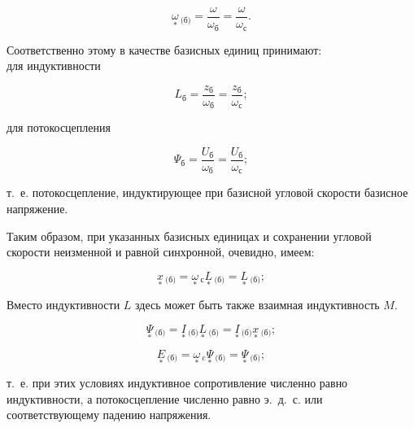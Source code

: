 \begin{equation} %
	\label{eq:chap2 omega_baz_otn}
	\underset{*}{\omega}\!\,_{\text{(б)}} = \frac{\omega}{\omega_{\text{б}}} = \frac{\omega}{\omega_{\text{с}}}.
\end{equation}

Соответственно этому в качестве базисных единиц принимают:\\
для индуктивности

\begin{equation*}
	L_{\text{б}} = \frac{z_{\text{б}}}{\omega_{\text{б}}} = \frac{z_{\text{б}}}{\omega_{\text{с}}};
\end{equation*}

для потокосцепления

\begin{equation*}
	\Psi_{\text{б}} = \frac{U_{\text{б}}}{\omega_{\text{б}}} = \frac{U_{\text{б}}}{\omega_{\text{с}}};
\end{equation*}

т.~е. потокосцепление, индуктирующее при базисной угловой скорости базисное напряжение.

Таким образом, при указанных базисных единицах и сохранении угловой скорости неизменной и равной синхронной, очевидно, имеем:

\begin{equation} %
	\label{eq:chap2 x_baz_otn_from_L}
	\underset{*}{x}\!\,_{\text{(б)}} = \underset{*}{\omega}\!\,_{\text{с}}\underset{*}{L}\!\,_{\text{(б)}} = \underset{*}{L}\!\,_{\text{(б)}};
\end{equation}

Вместо индуктивности $ L $ здесь может быть также взаимная индуктивность $ M $. %

\begin{equation} %
	\label{eq:chap2 Psi_baz_otn_from_I_and_L}
	\underset{*}{\Psi}\!\,_{\text{(б)}} = \underset{*}{I}\!\,_{\text{(б)}}\underset{*}{L}\!\,_{\text{(б)}} = \underset{*}{I}\!\,_{\text{(б)}}\underset{*}{x}\!\,_{\text{(б)}};
\end{equation}

\begin{equation} %
	\label{eq:chap2 E_baz_otn_from_omega_and_Psi}
	\underset{*}{E}\!\,_{\text{(б)}} = \underset{*}{\omega}\!\,_{\text{c}}\underset{*}{\Psi}\!\,_{\text{(б)}} = \underset{*}{\Psi}\!\,_{\text{(б)}};
\end{equation}

т.~е. при этих условиях индуктивное сопротивление численно равно индуктивности, а потокосцепление численно равно э.~д.~с. или соответствующему падению напряжения.

